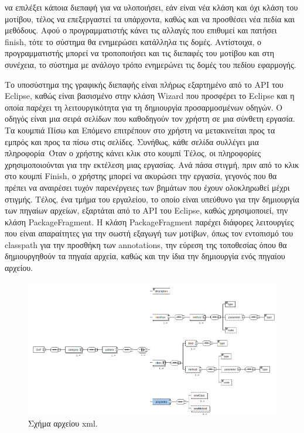να επιλέξει κάποια διεπαφή για να υλοποιήσει, εάν είναι νέα κλάση και όχι κλάση του μοτίβου, 
τέλος να επεξεργαστεί τα υπάρχοντα, καθώς και να προσθέσει νέα πεδία και μεθόδους. Αφού ο προγραμματιστής κάνει τις 
αλλαγές που επιθυμεί και πατήσει finish, τότε το σύστημα θα ενημερώσει κατάλληλα τις δομές. 
Αντίστοιχα, ο προγραμματιστής μπορεί να τροποποιήσει και τις διεπαφές του μοτίβου και στη συνέχεια, το σύστημα με ανάλογο τρόπο ενημερώνει 
τις δομές του πεδίου εφαρμογής. \par
Το υποσύστημα της γραφικής διεπαφής είναι πλήρως εξαρτημένο από το API του Eclipse, καθώς είναι 
βασισμένο στην κλάση Wizard που προσφέρει το Eclipse και η οποία παρέχει τη λειτουργικότητα για τη δημιουργία 
προσαρμοσμένων οδηγών. Ο οδηγός είναι μια σειρά σελίδων που καθοδηγούν τον χρήστη σε μια σύνθετη εργασία. 
Τα κουμπιά Πίσω και Επόμενο επιτρέπουν στο χρήστη να μετακινείται προς τα εμπρός και προς τα πίσω στις σελίδες. 
Συνήθως, κάθε σελίδα συλλέγει μια πληροφορία\anotelia \  Όταν ο χρήστης κάνει κλικ στο κουμπί Τέλος, οι πληροφορίες χρησιμοποιούνται 
για την εκτέλεση μιας εργασίας. Ανά πάσα στιγμή, πριν από το κλικ στο κουμπί Finish, ο χρήστης μπορεί να ακυρώσει την εργασία, 
γεγονός που θα πρέπει να αναιρέσει τυχόν παρενέργειες των βημάτων που έχουν ολοκληρωθεί μέχρι στιγμής. Τέλος, ένα τμήμα 
του εργαλείου, το οποίο είναι υπεύθυνο για την δημιουργία των πηγαίων αρχείων, εξαρτάται από το API του Eclipse, καθώς χρησιμοποιεί, 
την κλάση PackageFragment. Η κλάση PackageFragment παρέχει διάφορες λειτουργίες που είναι απαραίτητες για την σωστή εξαγωγή των μοτίβων, 
όπως τον εντοπισμό του classpath για την προσθήκη των annotations, την εύρεση της τοποθεσίας όπου θα δημιουργηθούν τα πηγαία αρχεία, 
καθώς και την ίδια την δημιουργία ενός πηγαίου αρχείου.
\begin{figure}[H]
    \centering
    \includegraphics[scale=0.5]{Figures/xsd_diagram.png}
    \caption{Σχήμα αρχείου xml.}
    \label{fig:xsd}
\end{figure}
